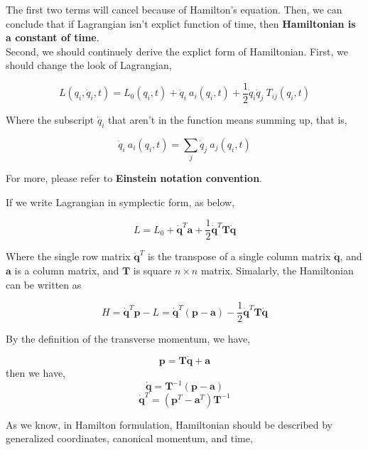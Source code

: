 \documentclass[12pt]{article}
\numberwithin{equation}{section}
\begin{document}
The first two terms will cancel because of Hamilton's equation.
Then, we can conclude that if Lagrangian isn't explict function of time, then \textbf{Hamiltonian is a constant of time}.
\\
\indent Second, we should continuely derive the explict form of Hamiltonian. First, we should change the look of Lagrangian,

\begin{center}
    \[ L(q_i, \dot{q}_i, t) = L_0(q_i,t) + \dot{q}_i\ a_i(q_i, t) + \frac{1}{2}\dot{q}_i\dot{q}_j\ T_{ij}(q_i, t) \]
\end{center}

Where the subscript $\dot{q}_i$ that aren't in the function means summing up, that is,

\begin{center}
    \[ \dot{q}_i\ a_i(q_i, t) = \sum_{j}{\dot{q}_j\ a_j(q_i, t)} \]
\end{center}

For more, please refer to \textbf{Einstein notation convention}.

If we write Lagrangian in symplectic form, as below,

\begin{center}
    \[ L = L_0 + \mathbf{\dot{q}}^T \mathbf{a} + \frac{1}{2}\mathbf{\dot{q}}^T \mathbf{T} \mathbf{\dot{q}} \]
\end{center}

Where the single row matrix $\mathbf{\dot{q}}^T$ is the transpose of a single column matrix $\mathbf{\dot{q}}$, and $\mathbf{a}$ is a column matrix, and $\mathbf{T}$ is square $n \times n$ matrix.
Simalarly, the Hamiltonian can be written as 

\begin{center}
    \[ H = \mathbf{\dot{q}}^T\mathbf{p} - L = \mathbf{\dot{q}}^T(\mathbf{p} - \mathbf{a}) - \frac{1}{2}\mathbf{\dot{q}}^T\mathbf{T}\mathbf{\dot{q}} \]
\end{center}

By the definition of the transverse momentum, we have,

\begin{center}
    \[ \mathbf{p} = \mathbf{T\dot{q}} + \mathbf{a} \]
    then we have,
    \[ \mathbf{\dot{q}} = \mathbf{T}^{-1}(\mathbf{p-a}) \]
    \[ \mathbf{\dot{q}}^T = (\mathbf{p}^T - \mathbf{a}^T)\mathbf{T}^{-1} \]
\end{center}

As we know, in Hamilton formulation, Hamiltonian should be described by generalized coordinates, canonical momentum, and time,
\end{document}
